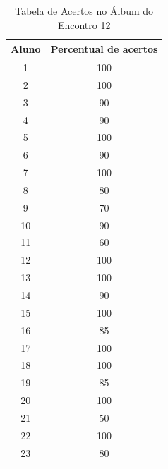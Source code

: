 \begin{table}[htbp] \centering
    \caption{Tabela de Acertos no Álbum do Encontro 12} \label{tab:Acertos do Encontro 12}
    \begin{tabular}{|c|c|}
        \hline
        \textbf{Aluno} & \textbf{Percentual de acertos} \\
        \hline
        1              & 100                            \\ \hline
        2              & 100                            \\ \hline
        3              & 90                             \\ \hline
        4              & 90                             \\ \hline
        5              & 100                            \\ \hline
        6              & 90                             \\ \hline
        7              & 100                            \\ \hline
        8              & 80                             \\ \hline
        9              & 70                             \\ \hline
        10             & 90                             \\ \hline
        11             & 60                             \\ \hline
        12             & 100                            \\ \hline
        13             & 100                            \\ \hline
        14             & 90                             \\ \hline
        15             & 100                            \\ \hline
        16             & 85                             \\ \hline
        17             & 100                            \\ \hline
        18             & 100                            \\ \hline
        19             & 85                             \\ \hline
        20             & 100                            \\ \hline
        21             & 50                             \\ \hline
        22             & 100                            \\ \hline
        23             & 80                             \\ \hline
    \end{tabular}
    \legend{\legendaTabela}
\end{table}

